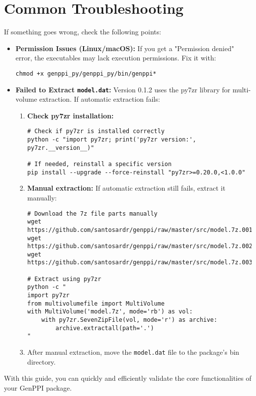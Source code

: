 \documentclass[11pt, a4paper]{article}
\begin{document}
\section{Common Troubleshooting}
If something goes wrong, check the following points:
\begin{itemize}
    \item \textbf{Permission Issues (Linux/macOS):} If you get a "Permission denied" error, the executables may lack execution permissions. Fix it with:
    \begin{lstlisting}[style=bashstyle]
chmod +x genppi_py/genppi_py/bin/genppi*
    \end{lstlisting}
    
    \item \textbf{Failed to Extract \texttt{model.dat}:} Version 0.1.2 uses the py7zr library for multi-volume extraction. If automatic extraction fails:
    \begin{enumerate}
        \item \textbf{Check py7zr installation:}
        \begin{lstlisting}[style=bashstyle]
# Check if py7zr is installed correctly
python -c "import py7zr; print('py7zr version:', py7zr.__version__)"

# If needed, reinstall a specific version
pip install --upgrade --force-reinstall "py7zr>=0.20.0,<1.0.0"
        \end{lstlisting}
        
        \item \textbf{Manual extraction:} If automatic extraction still fails, extract it manually:
        \begin{lstlisting}[style=bashstyle]
# Download the 7z file parts manually
wget https://github.com/santosardr/genppi/raw/master/src/model.7z.001
wget https://github.com/santosardr/genppi/raw/master/src/model.7z.002
wget https://github.com/santosardr/genppi/raw/master/src/model.7z.003

# Extract using py7zr
python -c "
import py7zr
from multivolumefile import MultiVolume
with MultiVolume('model.7z', mode='rb') as vol:
    with py7zr.SevenZipFile(vol, mode='r') as archive:
        archive.extractall(path='.')
"
        \end{lstlisting}
        
        \item After manual extraction, move the \texttt{model.dat} file to the package's bin directory.
    \end{enumerate}
\end{itemize}

With this guide, you can quickly and efficiently validate the core functionalities of your GenPPI package.
\end{document}
